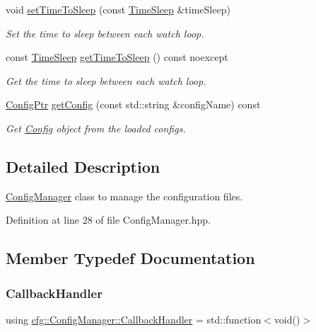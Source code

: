 \begin{DoxyCompactItemize}
void \hyperlink{classcfg_1_1_config_manager_a8a84b0efbaf6446b4c9254386606cda5}{set\+Time\+To\+Sleep} (const \hyperlink{namespacecfg_ab1a8f7060b6dfea6111c4449e81c6f8c}{Time\+Sleep} \&time\+Sleep)
\begin{DoxyCompactList}\small\item\em Set the time to sleep between each watch loop. \end{DoxyCompactList}\item 
const \hyperlink{namespacecfg_ab1a8f7060b6dfea6111c4449e81c6f8c}{Time\+Sleep} \hyperlink{classcfg_1_1_config_manager_a992557430937cec5387d84d44c721f7c}{get\+Time\+To\+Sleep} () const noexcept
\begin{DoxyCompactList}\small\item\em Get the time to sleep between each watch loop. \end{DoxyCompactList}\item 
\hyperlink{namespacecfg_af5f3a3fc2010c76e90bc66696485989f}{Config\+Ptr} \hyperlink{classcfg_1_1_config_manager_aa71c6277d421969606433b77d425d19d}{get\+Config} (const std\+::string \&config\+Name) const
\begin{DoxyCompactList}\small\item\em Get \hyperlink{classcfg_1_1_config}{Config} object from the loaded configs. \end{DoxyCompactList}\end{DoxyCompactItemize}


\subsection{Detailed Description}
\hyperlink{classcfg_1_1_config_manager}{Config\+Manager} class to manage the configuration files. 

Definition at line 28 of file Config\+Manager.\+hpp.



\subsection{Member Typedef Documentation}
\mbox{\label{classcfg_1_1_config_manager_a6614f22d32db38ce6d6ed5b351d4f628}} 
\subsubsection{\texorpdfstring{Callback\+Handler}{CallbackHandler}}
{\footnotesize\ttfamily using \hyperlink{classcfg_1_1_config_manager_a6614f22d32db38ce6d6ed5b351d4f628}{cfg\+::\+Config\+Manager\+::\+Callback\+Handler} =  std\+::function$<$void()$>$}



